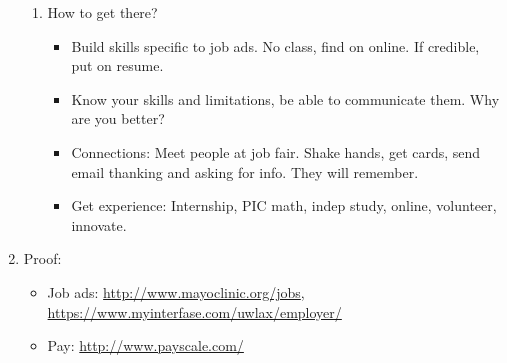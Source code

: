 \documentclass{article}
\theoremstyle{remark}
\begin{document}
\begin{enumerate}
\begin{enumerate}
\item How to get there?
\begin{itemize}
\item Build skills specific to job ads. No class, find on online. If credible, put on resume.
\item Know your skills and limitations, be able to communicate them. Why are you better?
\item Connections: Meet people at job fair. Shake hands, get cards, send email thanking and asking for info. They will remember.
\item Get experience: Internship, PIC math, indep study, online, volunteer, innovate.
\end{itemize}
\end{enumerate}

\item Proof:
\begin{itemize}
\item Job ads: \url{http://www.mayoclinic.org/jobs}, \url{https://www.myinterfase.com/uwlax/employer/}
\item Pay: \url{http://www.payscale.com/}
\end{itemize}

\end{enumerate}
\end{document}
